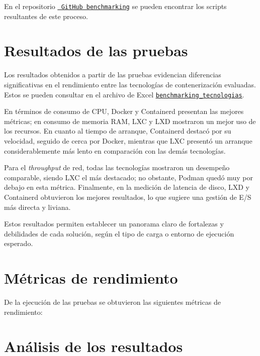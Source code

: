 En el repositorio \underline{\href{https://github.com/Anubis-1001/benchmark-tecnologias-de-contenerizacion} {\texttt{ GitHub benchmarking}}} se pueden encontrar los scripts resultantes de este proceso.

\section{Resultados de las pruebas}

Los resultados obtenidos a partir de las pruebas evidencian diferencias significativas en el rendimiento entre las tecnologías de contenerización evaluadas. Estos se pueden consultar en el archivo de Excel \underline{\href{https://docs.google.com/spreadsheets/d/1Ce37Sm3Swyfa88Ur1yQbLarq_D86obUIAGGJocgQbUE/edit?usp=sharing} {\texttt{benchmarking\_tecnologias}}}.

En términos de consumo de CPU, Docker y Containerd presentan las mejores métricas; en consumo de memoria RAM, LXC y LXD mostraron un mejor uso de los recursos. En cuanto al tiempo de arranque, Containerd destacó por su velocidad, seguido de cerca por Docker, mientras que LXC presentó un arranque considerablemente más lento en comparación con las demás tecnologías.

Para el \textit{throughput} de red, todas las tecnologías mostraron un desempeño comparable, siendo LXC el más destacado; no obstante, Podman quedó muy por debajo en esta métrica. Finalmente, en la medición de latencia de disco, LXD y Containerd obtuvieron los mejores resultados, lo que sugiere una gestión de E/S más directa y liviana.

Estos resultados permiten establecer un panorama claro de fortalezas y debilidades de cada solución, según el tipo de carga o entorno de ejecución esperado.

\section{Métricas de rendimiento}

De la ejecución de las pruebas se obtuvieron las siguientes métricas de rendimiento:






\section{Análisis de los resultados}

